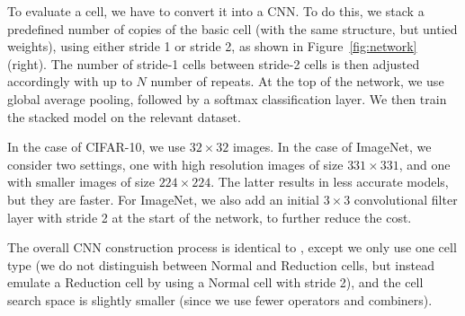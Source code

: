 \documentclass[runningheads]{llncs}
\begin{document}
To evaluate a cell, we have to convert it into a CNN.
To do this, 
we stack a predefined number of copies of the basic cell (with the same structure, but untied weights),
using either stride 1 or stride 2, as shown in 
Figure~\ref{fig:network} (right). 
The number of stride-1 cells between stride-2 cells is then adjusted accordingly with up to $N$ number of repeats.
At the top of the network, we use global average pooling, followed by a softmax classification layer.
We then train the stacked model on the relevant dataset.

In the case of CIFAR-10, we use $32 \times 32$ images.
In the case of ImageNet, we consider two settings,
one with high resolution images of size $331 \times 331$,
and one with smaller images of size $224 \times 224$.
The latter results in less accurate models, but they are faster.
For ImageNet,
we also add an initial $3 \times 3$ convolutional filter layer  with stride 2 at the start of the network, to further reduce the cost.

The overall CNN construction process is identical to  \cite{DBLP:journals/corr/ZophVSL17},
except we only use one cell type (we do not distinguish between Normal and Reduction cells, but instead emulate a Reduction cell by using a Normal cell with stride 2),
and the cell search space is slightly smaller (since we use fewer operators and combiners).
\end{document}

